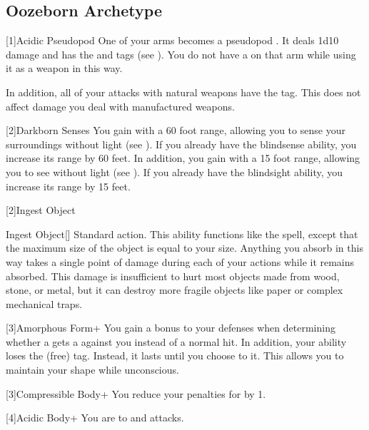   \subsection{Oozeborn Archetype}

    [1]{Acidic Pseudopod} One of your arms becomes a pseudopod .
      It deals 1d10 damage and has the \atAcid and  tags (see ).
      You do not have a  on that arm while using it as a weapon in this way.

      In addition, all of your attacks with natural weapons have the \atAcid tag.
      This does not affect damage you deal with manufactured weapons.

    [2]{Darkborn Senses} You gain  with a 60 foot range, allowing you to sense your surroundings without light (see ).
      If you already have the blindsense ability, you increase its range by 60 feet.
      In addition, you gain  with a 15 foot range, allowing you to see without light (see ).
      If you already have the blindsight ability, you increase its range by 15 feet.

    [2]{Ingest Object} 
    \begin{activeability}{Ingest Object}[\atAcid]
      \abilityusagetime Standard action.
      \rankline
      This ability functions like the  spell, except that the maximum size of the object is equal to your size.
      Anything you absorb in this way takes a single point of  damage during each of your actions while it remains absorbed.
      This damage is insufficient to hurt most objects made from wood, stone, or metal, but it can destroy more fragile objects like paper or complex mechanical traps.
    \end{activeability}

    [3]{Amorphous Form+} You gain a  bonus to your defenses when determining whether a  gets a  against you instead of a normal hit.
      In addition, your  ability loses the  (free) tag.
      Instead, it lasts until you choose to  it.
      This allows you to maintain your shape while unconscious.

    [3]{Compressible Body+} You reduce your penalties for \squeezing by 1.

    [4]{Acidic Body+} You are  to \atAcid and \atPoison attacks.

